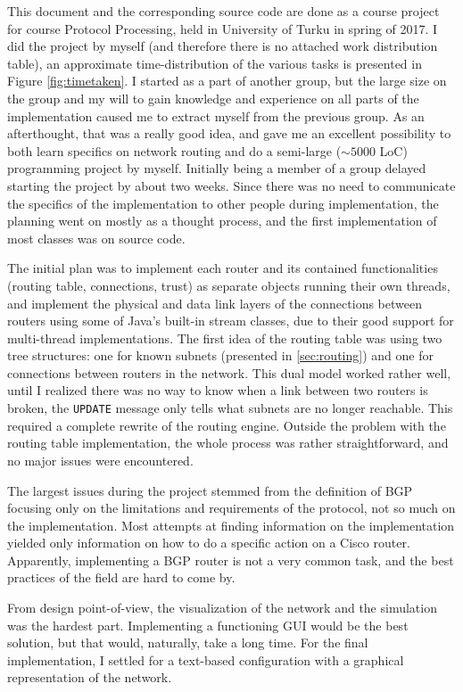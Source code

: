 \documentclass[11pt,a4paper,titlepage]{report}
\begin{document}
This document and the corresponding source code are done as a course project for course Protocol Processing, held in University of Turku in spring of 2017. I did the project by myself (and therefore there is no attached work distribution table), an approximate time-distribution of the various tasks is presented in Figure \ref{fig:timetaken}. I started as a part of another group, but the large size on the group and my will to gain knowledge and experience on all parts of the implementation caused me to extract myself from the previous group. As an afterthought, that was a really good idea, and gave me an excellent possibility to both learn specifics on network routing and do a semi-large ($\sim 5000$ LoC) programming project by myself. Initially being a member of a group delayed starting the project by about two weeks. Since there was no need to communicate the specifics of the implementation to other people during implementation, the planning went on mostly as a thought process, and the first implementation of most classes was on source code.

The initial plan was to implement each router and its contained functionalities (routing table, connections, trust) as separate objects running their own threads, and implement the physical and data link layers of the connections between routers using some of Java's built-in stream classes, due to their good support for multi-thread implementations. The first idea of the routing table was using two tree structures: one for known subnets (presented in \ref{sec:routing}) and one for connections between routers in the network. This dual model worked rather well, until I realized there was no way to know when a link between two routers is broken, the \texttt{UPDATE} message only tells what subnets are no longer reachable. This required a complete rewrite of the routing engine. Outside the problem with the routing table implementation, the whole process was rather straightforward, and no major issues were encountered.

The largest issues during the project stemmed from the definition of BGP \cite{RFC4271} focusing only on the limitations and requirements of the protocol, not so much on the implementation. Most attempts at finding information on the implementation yielded only information on how to do a specific action on a Cisco router. Apparently, implementing a BGP router is not a very common task, and the best practices of the field are hard to come by.

From design point-of-view, the visualization of the network and the simulation was the hardest part. Implementing a functioning GUI would be the best solution, but that would, naturally, take a long time. For the final implementation, I settled for a text-based configuration with a graphical representation of the network.
\end{document}
